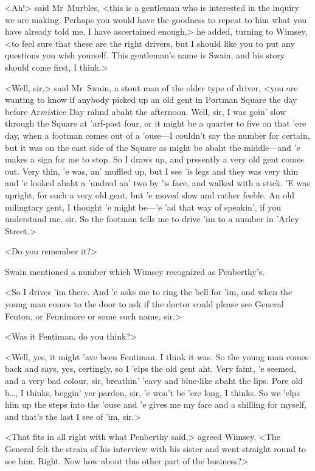 <Ah!> said Mr~Murbles, <this is a gentleman who is interested in the inquiry we are making. Perhaps you would have the goodness to repeat to him what you have already told me. I have ascertained enough,> he added, turning to Wimsey, <to feel sure that these are the right drivers, but I should like you to put any questions you wish yourself. This gentleman's name is Swain, and his story should come first, I think.>

<Well, sir,> said Mr~Swain, a stout man of the older type of driver, <you are wanting to know if anybody picked up an old gent in Portman Square the day before Ar\emph{mis}tice Day rahnd abaht the afternoon. Well, sir, I was goin' slow through the Square at 'arf-past four, or it might be a quarter to five on that 'ere day, when a footman comes out of a 'ouse—I couldn't say the number for certain, but it was on the east side of the Square as might be abaht the middle—and 'e makes a sign for me to stop. So I draws up, and presently a very old gent comes out. Very thin, 'e was, an' muffled up, but I see 'is legs and they was very thin and 'e looked abaht a 'undred an' two by 'is face, and walked with a stick. 'E was upright, for such a very old gent, but 'e moved slow and rather feeble. An old milingtary gent, I thought 'e might be—'e 'ad that way of speakin', if you understand me, sir. So the footman tells me to drive 'im to a number in 'Arley Street.>

<Do you remember it?>

Swain mentioned a number which Wimsey recognized as Penberthy's.

<So I drives 'im there. And 'e asks me to ring the bell for 'im, and when the young man comes to the door to ask if the doctor could please see General Fenton, or Fennimore or some such name, sir.>

<Was it Fentiman, do you think?>

<Well, yes, it might 'ave been Fentiman. I think it was. So the young man comes back and says, yes, certingly, so I 'elps the old gent aht. Very faint, 'e seemed, and a very bad colour, sir, breathin' 'eavy and blue-like abaht the lips. Pore old b\dots, I thinks, beggin' yer pardon, sir, 'e won't be 'ere long, I thinks. So we 'elps him up the steps into the 'ouse and 'e gives me my fare and a shilling for myself, and that's the last I see of 'im, sir.>

<That fits in all right with what Penberthy said,> agreed Wimsey. <The General felt the strain of his interview with his sister and went straight round to see him. Right. Now how about this other part of the business?>

